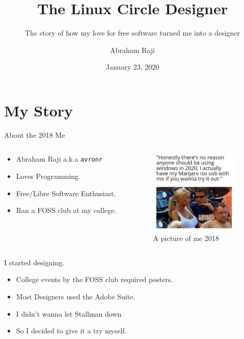 \documentclass[presentation]{beamer}
\author{Abraham Raji}
\date{January 23, 2020}
\title{The Linux Circle Designer}
\subtitle{The story of how my love for free software turned me into a designer}}
\begin{document}
\maketitle

\section*{My Story}
\label{sec:org63a71df}
\begin{frame}[label={sec:orga96c81d},fragile]{About the 2018 Me}
 \begin{columns}
\begin{column}{0.5\columnwidth}
\begin{itemize}
\item Abraham Raji a.k.a \texttt{avronr}
\item Loves Programming.
\item Free/Libre Software Enthusiast.
\item Ran a FOSS club at my college.
\end{itemize}
\end{column}
\begin{column}{0.5\columnwidth}
\begin{figure}[htbp]
\centering
\includegraphics[height=40mm]{././meold.png}
\caption{A picture of me 2018}
\end{figure}
\end{column}
\end{columns}
\end{frame}
\begin{frame}[label={sec:orgbce52c5}]{I started designing.}
\begin{itemize}
\item College events by the FOSS club required posters.
\item Most Designers used the Adobe Suite.
\item I didn't wanna let Stallman down
\item So I decided to give it a try myself.
\end{itemize}
\end{frame}
\end{document}
